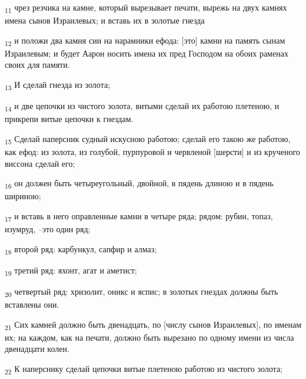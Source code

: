 \begin{tcolorbox}
\textsubscript{11} чрез резчика на камне, который вырезывает печати, вырежь на двух камнях имена сынов Израилевых; и вставь их в золотые гнезда
\end{tcolorbox}
\begin{tcolorbox}
\textsubscript{12} и положи два камня сии на нарамники ефода: [это] камни на память сынам Израилевым; и будет Аарон носить имена их пред Господом на обоих раменах своих для памяти.
\end{tcolorbox}
\begin{tcolorbox}
\textsubscript{13} И сделай гнезда из золота;
\end{tcolorbox}
\begin{tcolorbox}
\textsubscript{14} и две цепочки из чистого золота, витыми сделай их работою плетеною, и прикрепи витые цепочки к гнездам.
\end{tcolorbox}
\begin{tcolorbox}
\textsubscript{15} Сделай наперсник судный искусною работою; сделай его такою же работою, как ефод: из золота, из голубой, пурпуровой и червленой [шерсти] и из крученого виссона сделай его;
\end{tcolorbox}
\begin{tcolorbox}
\textsubscript{16} он должен быть четыреугольный, двойной, в пядень длиною и в пядень шириною;
\end{tcolorbox}
\begin{tcolorbox}
\textsubscript{17} и вставь в него оправленные камни в четыре ряда; рядом: рубин, топаз, изумруд, --это один ряд;
\end{tcolorbox}
\begin{tcolorbox}
\textsubscript{18} второй ряд: карбункул, сапфир и алмаз;
\end{tcolorbox}
\begin{tcolorbox}
\textsubscript{19} третий ряд: яхонт, агат и аметист;
\end{tcolorbox}
\begin{tcolorbox}
\textsubscript{20} четвертый ряд: хризолит, оникс и яспис; в золотых гнездах должны быть вставлены они.
\end{tcolorbox}
\begin{tcolorbox}
\textsubscript{21} Сих камней должно быть двенадцать, по [числу сынов Израилевых], по именам их; на каждом, как на печати, должно быть вырезано по одному имени из числа двенадцати колен.
\end{tcolorbox}
\begin{tcolorbox}
\textsubscript{22} К наперснику сделай цепочки витые плетеною работою из чистого золота;
\end{tcolorbox}
